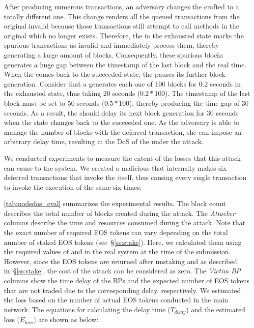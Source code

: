 After producing numerous transactions, an adversary changes the crafted \SC to a
totally different one. This change renders all the queued transactions from the
original \SC invalid because those transactions still attempt to call methods in
the original \SC which no longer exists.
%
Therefore, the \BP in the exhausted state marks the spurious transactions as
invalid and immediately process them, thereby generating a large amount of
blocks.
%
Consequently, these spurious blocks generates a huge gap between the timestamp
of the last block and the real time. When the \BP comes back to the succeeded
state, the \BP pauses its further block generation.
%
Consider that a \BP generates each one of 100 blocks for 0.2 seconds in the
exhausted state, thus taking 20 seconds ($0.2 * 100$). The timestamp of the last
block must be set to 50 seconds ($0.5 * 100$), thereby producing the time gap of
30 seconds. As a result, the \BP should delay its next block generation for 30
seconds when the state changes back to the succeeded one.
%
As the adversary is able to manage the number of blocks with the deferred
transaction, she can impose an arbitrary delay time, resulting in the DoS of
the \BP under the attack.



We conducted experiments to measure the extent of the losses that this attack
can cause to the \eos system.
%
We created a malicious \SC that internally makes six deferred transactions
that invoke the \SC itself, thus causing every single transaction to invoke the
execution of the same \SC six times.

\autoref{tab:nodedos_eval} summarizes the experimental results.
%
The block count describes the total number of blocks created during the attack.
%
The \textit{Attacker} columns describe the time and \eos resources consumed
during the attack.
%
%
Note that the exact number of required EOS tokens can vary depending on the
total number of staked EOS tokens (see~\S\ref{ss:stake}). Here, we calculated
them using the required values of \cpu and \ram in the real \eos system at the
time of the submission.
%
However, since the EOS tokens are returned after unstaking \cpu and \net as
described in~\S\ref{ss:stake}, the cost of the attack can be considered as zero.
%
The \textit{Victim BP} columns show the time delay of the BPs and the expected
number of EOS tokens that are not traded due to the corresponding delay,
respectively.
%
We estimated the loss based on the number of actual EOS tokens conducted in the
main \eos network. The equations for calculating the delay time ($T_{delay}$)
and the estimated loss ($E_{loss}$) are shown as below:

